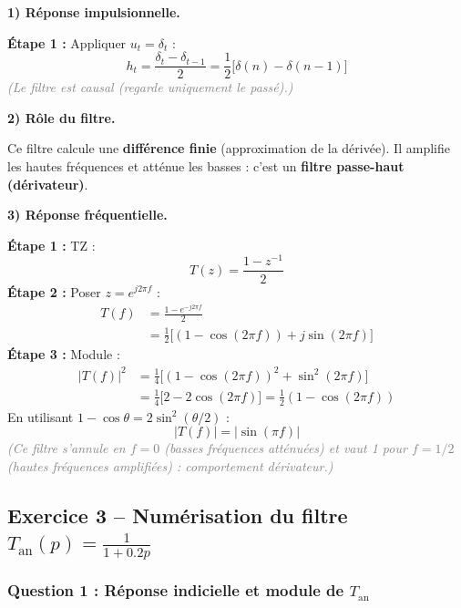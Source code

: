 \documentclass[12pt,a4paper]{article}
\newcommand{\step}[1]{\textcolor{coursbleu}{\textbf{Étape #1 :}}}
\newcommand{\explication}[1]{\textit{\textcolor{gray}{(#1)}}}
\newcommand{\encadre}[1]{\boxed{#1}}
\begin{document}
\begin{tcolorbox}[corrbox, title=Correction -- Cas b : Dérivateur]
\textbf{1) Réponse impulsionnelle.}

\step{1} Appliquer $u_t = \delta_t$ :
\[
  h_t = \frac{\delta_t - \delta_{t-1}}{2} = \frac{1}{2}\bigl[\delta(n) - \delta(n-1)\bigr]
\]
\explication{Le filtre est causal (regarde uniquement le passé).}

\medskip
\textbf{2) Rôle du filtre.}

Ce filtre calcule une \textbf{différence finie} (approximation de la dérivée).
Il amplifie les hautes fréquences et atténue les basses : c'est un \textbf{filtre passe-haut (dérivateur)}.

\medskip
\textbf{3) Réponse fréquentielle.}

\step{1} TZ :
\[
  T(z) = \frac{1 - z^{-1}}{2}
\]
\step{2} Poser $z = e^{j2\pi f}$ :
\begin{align*}
  T(f) &= \frac{1 - e^{-j2\pi f}}{2} \\
       &= \frac{1}{2}\bigl[(1 - \cos(2\pi f)) + j\sin(2\pi f)\bigr]
\end{align*}
\step{3} Module :
\begin{align*}
  |T(f)|^2 &= \frac{1}{4}\bigl[(1-\cos(2\pi f))^2 + \sin^2(2\pi f)\bigr] \\
            &= \frac{1}{4}\bigl[2 - 2\cos(2\pi f)\bigr] = \frac{1}{2}(1-\cos(2\pi f))
\end{align*}
En utilisant $1 - \cos\theta = 2\sin^2(\theta/2)$ :
\[
  \encadre{|T(f)| = \left|\sin(\pi f)\right|}
\]
\explication{Ce filtre s'annule en $f=0$ (basses fréquences atténuées)
et vaut 1 pour $f=1/2$ (hautes fréquences amplifiées) : comportement dérivateur.}
\end{tcolorbox}

\subsection{Exercice 3 -- Numérisation du filtre
  \texorpdfstring{$T_{\text{an}}(p) = \frac{1}{1 + 0.2p}$}{Tan(p) = 1/(1 + 0.2p)}}

\subsubsection*{Question 1 : Réponse indicielle et module de $T_{\text{an}}$}
\end{document}
